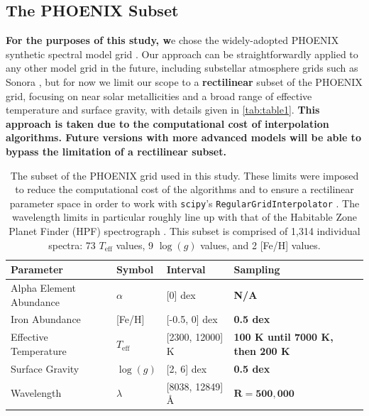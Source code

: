 \documentclass[twocolumn, linenumbers]{aastex631}
\begin{document}
\subsection{The PHOENIX Subset}
\textbf{For the purposes of this study, w}e chose the widely-adopted PHOENIX synthetic spectral model grid \citep{PHOENIX}.
Our approach can be straightforwardly applied to any other model grid in the future, including substellar atmosphere grids such as Sonora \citep{bobcat, cholla, diamondback, elfowl}, but for now we limit our scope to a \textbf{rectilinear} subset of the PHOENIX grid, focusing on near solar metallicities and a broad range of effective temperature and surface gravity, with details given in \autoref{tab:table1}.
\textbf{This approach is taken due to the computational cost of interpolation algorithms.
Future versions with more advanced models will be able to bypass the limitation of a rectilinear subset.}

\begin{table}
    \hspace*{0.6cm}\begin{tabular}{llll}
        \hline
        \bf{Parameter} & \bf{Symbol} & \bf{Interval} & \bf{Sampling}\\
        \hline
        Alpha Element Abundance & $\alpha$ & [0] dex & \bf{N/A}\\
        Iron Abundance & [Fe/H] & [-0.5, 0] dex & \bf{0.5 dex}\\
        Effective Temperature & $T_{\mathrm{eff}}$ & [2300, 12000] K & \bf{100 K until 7000 K, then 200 K}\\
        Surface Gravity & $\log(g)$ & [2, 6] dex & \bf{0.5 dex} \\
        Wavelength & $\lambda$ & [8038, 12849] \AA & $\mathbf{R = 500,000}$\\
        \hline
    \end{tabular}
    \caption{The subset of the PHOENIX grid used in this study.
    These limits were imposed to reduce the computational cost of the algorithms and to ensure a rectilinear parameter space in order to work with \texttt{scipy}'s \texttt{RegularGridInterpolator} \citep{scipy}.
    The wavelength limits in particular roughly line up with that of the Habitable Zone Planet Finder (HPF) spectrograph \citep{HPF}.
    This subset is comprised of 1,314 individual spectra: 73 $T_{\mathrm{eff}}$ values, 9 $\log(g)$ values, and 2 [Fe/H] values.}
    \label{tab:table1}
\end{table}
\end{document}

